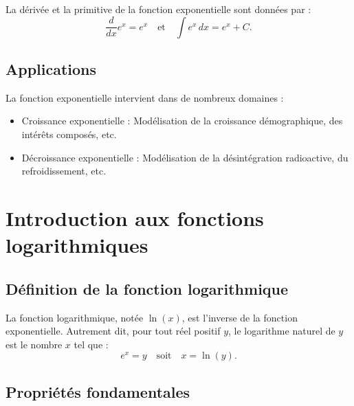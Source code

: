 \documentclass{article}
\begin{document}
	La dérivée et la primitive de la fonction exponentielle sont données par :
	\[
	\frac{d}{dx} e^x = e^x \quad \text{et} \quad \int e^x \, dx = e^x + C.
	\]
	
	\subsection{Applications}
	
	La fonction exponentielle intervient dans de nombreux domaines :
	\begin{itemize}
		\item Croissance exponentielle : Modélisation de la croissance démographique, des intérêts composés, etc.
		\item Décroissance exponentielle : Modélisation de la désintégration radioactive, du refroidissement, etc.
	\end{itemize}
	                                                                    \section{Introduction aux fonctions logarithmiques}
	                                                                    
	                                                                    \subsection{Définition de la fonction logarithmique}
	                                                                    
	                                                                    La fonction logarithmique, notée \( \ln(x) \), est l'inverse de la fonction exponentielle. Autrement dit, pour tout réel positif \( y \), le logarithme naturel de \( y \) est le nombre \( x \) tel que :
	                                                                    \[
	                                                                    e^x = y \quad \text{soit} \quad x = \ln(y).
	                                                                    \]
	                                                                    
	                                                                    \subsection{Propriétés fondamentales}
	                                                                    
\end{document}
